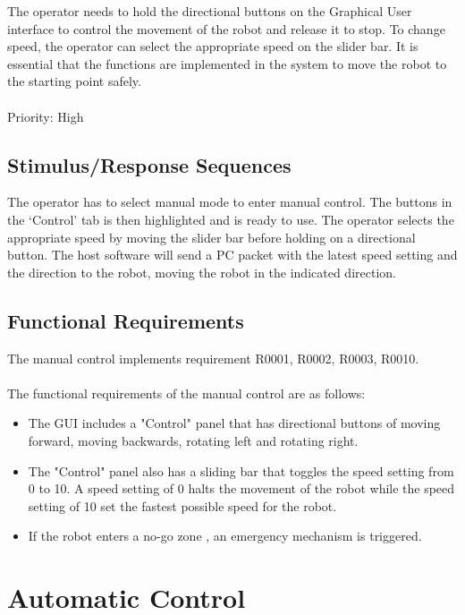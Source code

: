 \documentclass[11pt, a4paper]{report}
\begin{document}
The operator needs to hold the directional buttons on the Graphical User interface to control the movement of the robot and release it to stop. To change speed, the operator can select the appropriate speed on the slider bar. It is essential that the functions are implemented in the system to
move the robot to the starting point safely.\\ \\
Priority: High

\subsection {Stimulus/Response Sequences}

The operator has to select manual mode to enter manual control. The buttons in the
`Control' tab is then highlighted and is ready to use. The operator selects the appropriate speed by
moving the slider bar before holding on a directional button. The host software will send a PC packet
with the latest speed setting and the direction to the robot, moving the robot in the
indicated direction.

\subsection{Functional Requirements}


The manual control implements requirement R0001, R0002, R0003, R0010.\\ \\
The functional requirements of the manual control are as follows:
\begin{itemize}
	\item The GUI includes a "Control" panel that has directional buttons of moving
	forward, moving backwards, rotating left and rotating right.
	\item The "Control" panel also has a sliding bar that toggles the speed setting from 0 to 10. A speed setting of 0 halts the movement of the robot while the speed setting of 10 set the fastest possible speed for the robot. 
	\item If the robot enters a no-go zone , an emergency mechanism is triggered.
\end{itemize}


\section {Automatic Control}
\end{document}
